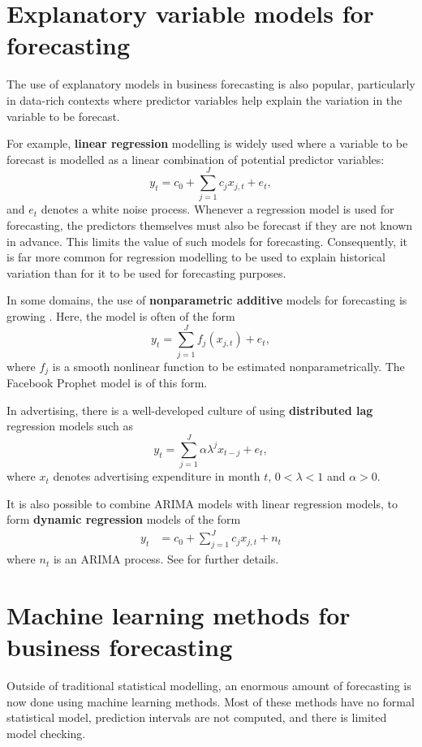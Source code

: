 \documentclass[a4paper,10pt]{article}
\begin{document}
\section{Explanatory variable models for forecasting}

The use of explanatory models in business forecasting is also popular, particularly in data-rich contexts where predictor variables help explain the variation in the variable to be forecast.

For example, \textbf{linear regression} modelling is widely used \citep[e.g.,][]{Pardoe06} where a variable to be forecast is modelled as a linear combination of potential predictor variables:
\[
	y_t = c_0 + \sum_{j=1}^J c_j x_{j,t} + e_t,
\]
and $e_t$ denotes a white noise process. Whenever a regression model is used for forecasting, the predictors themselves must also be forecast if they are not known in advance. This limits the value of such models for forecasting. Consequently, it is far more common for regression modelling to be used to explain historical variation than for it to be used for forecasting purposes.

In some domains, the use of \textbf{nonparametric additive} models for forecasting is growing \citep[e.g.,][]{HF10}. Here, the model is often of the form
\[
	y_t = \sum_{j=1}^J f_j(x_{j,t}) + e_t,
\]
where $f_j$ is a smooth nonlinear function to be estimated nonparametrically. The Facebook Prophet model \citet{prophet2018} is of this form.

In advertising, there is a well-developed culture of using \textbf{distributed lag} regression models \citep[e.g.,][]{HPS01} such as
\[
	y_t = \sum_{j=1}^J \alpha\lambda^j x_{t-j} + e_t,
\]
where $x_t$ denotes advertising expenditure in month $t$, $0<\lambda<1$ and $\alpha>0$.

It is also possible to combine ARIMA models with linear regression models, to form \textbf{dynamic regression} models of the form
\begin{align*}
	y_t & = c_0 + \sum_{j=1}^J c_j x_{j,t} + n_t
\end{align*}
where $n_t$ is an ARIMA process. See \citet{fpp3} for further details.

\section{Machine learning methods for business forecasting}

Outside of traditional statistical modelling, an enormous amount of forecasting is now done using machine learning methods. Most of these methods have no formal statistical model, prediction intervals are not computed, and there is limited model checking.
\end{document}
